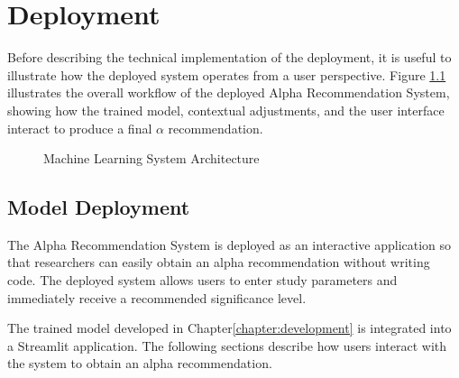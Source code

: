 \chapter{Deployment}
\label{chapter:deplyment}
Before describing the technical implementation of the deployment, it is useful to illustrate how the deployed system operates from a user perspective. Figure \ref{fig:deployment_workflow} illustrates the overall workflow 
of the deployed Alpha Recommendation System, showing how the 
trained model, contextual adjustments, and the user interface 
interact to produce a final $\alpha$ recommendation.
\begin{figure}[h]
	\centering
	\caption{Machine Learning System Architecture}
	\label{fig:deployment_workflow}
\end{figure}
\section{Model Deployment}

The Alpha Recommendation System is deployed as an interactive application so that researchers can easily obtain an alpha recommendation without writing code. The deployed system allows users to enter study parameters and immediately receive a recommended significance level.

The trained model developed in Chapter\ref{chapter:development} is integrated into a Streamlit application. The following sections describe how users interact with the system to obtain an alpha recommendation.


